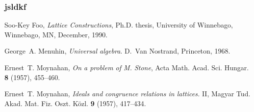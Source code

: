 \documentclass{beamer}
\begin{document}
\begin{frame}
	\frametitle{jsldkf}
\begin{thebibliography}{9}

Soo-Key Foo, 
\emph{Lattice Constructions}, 
Ph.D. thesis, 
University of Winnebago, Winnebago, MN, December, 1990.

George~A. Menuhin, 
\emph{Universal algebra}.
D.~Van Nostrand, Princeton, 1968.

Ernest~T. Moynahan, 
\emph{On a problem of M. Stone},
Acta Math. Acad. Sci. Hungar. \textbf{8} (1957), 
455--460.

Ernest~T. Moynahan, 
\emph{Ideals and congruence relations in lattices.} II,
Magyar Tud. Akad. Mat. Fiz. Oszt. K\"{o}zl. \textbf{9} 
(1957), 417--434.

\end{thebibliography}
\end{frame}
\end{document}
